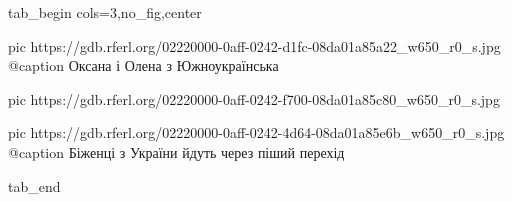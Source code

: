  
 
 
 
 


\ifcmt
  tab_begin cols=3,no_fig,center

     pic https://gdb.rferl.org/02220000-0aff-0242-d1fc-08da01a85a22_w650_r0_s.jpg
		 @caption Оксана і Олена з Южноукраїнська

		 pic https://gdb.rferl.org/02220000-0aff-0242-f700-08da01a85c80_w650_r0_s.jpg

		 pic https://gdb.rferl.org/02220000-0aff-0242-4d64-08da01a85e6b_w650_r0_s.jpg
		 @caption Біженці з України йдуть через піший перехід

  tab_end
\fi
